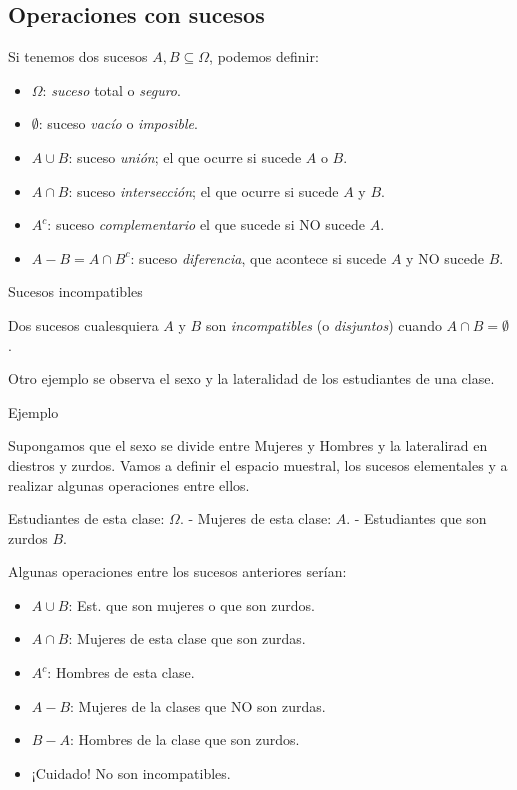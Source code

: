 \documentclass[
  letterpaper,
  DIV=11,
  numbers=noendperiod]{scrreprt}
\providecommand{\tightlist}{%
  \setlength{\itemsep}{0pt}\setlength{\parskip}{0pt}}\usepackage{longtable,booktabs,array}
\begin{document}
\subsection{Operaciones con sucesos}\label{operaciones-con-sucesos}

Si tenemos dos sucesos \(A,B\subseteq \Omega\), podemos definir:

\begin{itemize}
\tightlist
\item
  \(\Omega\): \emph{suceso} total o \emph{seguro}.
\item
  \(\emptyset\): suceso \emph{vacío} o \emph{imposible}.
\item
  \(A\cup B\): suceso \emph{unión}; el que ocurre si sucede \(A\) o
  \(B\).
\item
  \(A\cap B\): suceso \emph{intersección}; el que ocurre si sucede \(A\)
  y \(B\).
\item
  \(A^c\): suceso \emph{complementario} el que sucede si NO sucede
  \(A\).
\item
  \(A- B=A\cap B^c\): suceso \emph{diferencia}, que acontece si sucede
  \(A\) y NO sucede \(B\).
\end{itemize}

Sucesos incompatibles

Dos sucesos cualesquiera \(A\) y \(B\) son \emph{incompatibles} (o
\emph{disjuntos}) cuando \(A\cap B=\emptyset\).

Otro ejemplo se observa el sexo y la lateralidad de los estudiantes de
una clase.

Ejemplo

Supongamos que el sexo se divide entre Mujeres y Hombres y la
lateralirad en diestros y zurdos. Vamos a definir el espacio muestral,
los sucesos elementales y a realizar algunas operaciones entre ellos.

Estudiantes de esta clase: \(\Omega\). - Mujeres de esta clase: \(A\). -
Estudiantes que son zurdos \(B\).

Algunas operaciones entre los sucesos anteriores serían:

\begin{itemize}
\tightlist
\item
  \(A\cup B\): Est. que son mujeres o que son zurdos.
\item
  \(A\cap B\): Mujeres de esta clase que son zurdas.
\item
  \(A^c\): Hombres de esta clase.
\item
  \(A-B\): Mujeres de la clases que NO son zurdas.
\item
  \(B-A\): Hombres de la clase que son zurdos.
\item
  ¡Cuidado! No son incompatibles.
\end{itemize}
\end{document}
